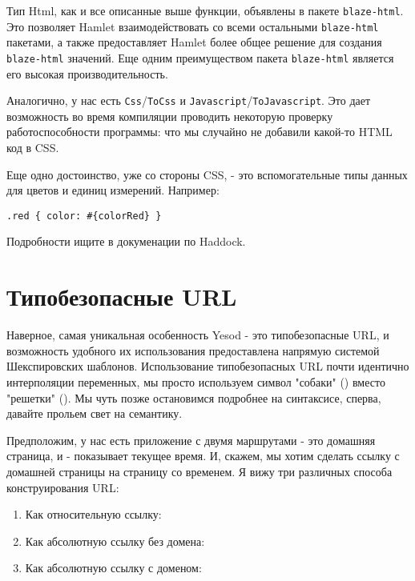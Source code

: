 Тип Html, как и все описанные выше функции, объявлены в пакете 
\texttt{blaze-html}. Это позволяет Hamlet взаимодействовать со всеми 
остальными \texttt{blaze-html} пакетами, а также предоставляет Hamlet 
более общее решение для создания \texttt{blaze-html} значений. 
Еще одним преимуществом пакета \texttt{blaze-html} является 
его высокая производительность.

Аналогично, у нас есть \lstinline!Css!/\lstinline!ToCss! и 
\lstinline!Javascript!/\lstinline!ToJavascript!. Это дает возможность во время
компиляции проводить некоторую проверку работоспособности программы: что мы 
случайно не добавили какой-то HTML код в CSS.

Еще одно достоинство, уже со стороны CSS, - это вспомогательные типы данных для 
цветов и единиц измерений. Например: 

\begin{lstlisting}
.red { color: #{colorRed} }
\end{lstlisting}

Подробности ищите в докуменации по Haddock.

\section{Типобезопасные URL}
Наверное, самая уникальная особенность Yesod - это типобезопасные URL, и 
возможность удобного их использования предоставлена напрямую системой 
Шекспировских шаблонов.
Использование типобезопасных URL почти идентично интерполяции переменных,
мы просто используем символ "собаки" () вместо "решетки" (\textt{#}).
Мы чуть позже остановимся подробнее на синтаксисе, сперва, давайте прольем свет
на семантику.

Предположим, у нас есть приложение с двумя маршрутами 
 - это домашняя страница, и 
 - показывает текущее время.
И, скажем, мы хотим сделать ссылку с домашней страницы на страницу со временем.
Я вижу три различных способа конструирования URL:
\begin{enumerate}
  \item Как относительную ссылку: 
  \item Как абсолютную ссылку без домена: 
  \item Как абсолютную ссылку с доменом: 
\end{enumerate}

